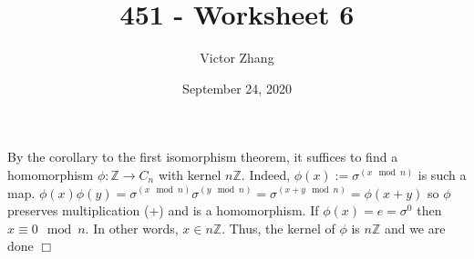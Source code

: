 \documentclass{article}
\title{451 - Worksheet 6}
\author{Victor Zhang}
\date{September 24, 2020}
\begin{document}
\maketitle

\section{}
By the corollary to the first isomorphism theorem, it suffices to find a homomorphism $\phi: \mathbb{Z} \rightarrow C_n$ with kernel $n\mathbb{Z}$. Indeed, $\phi(x) := \sigma^{(x\mod{n})}$ is such a map. $\phi(x)\phi(y) = \sigma^{(x\mod{n})}\sigma^{(y\mod{n})} = \sigma^{(x+y\mod{n})} = \phi(x+y)$ so $\phi$ preserves multiplication (+) and is a homomorphism. If $\phi(x) = e = \sigma^0$ then $x \equiv 0 \mod{n}$. In other words, $x \in n \mathbb{Z}$. Thus, the kernel of $\phi$ is $n \mathbb{Z}$ and we are done $\Box$
\end{document}
